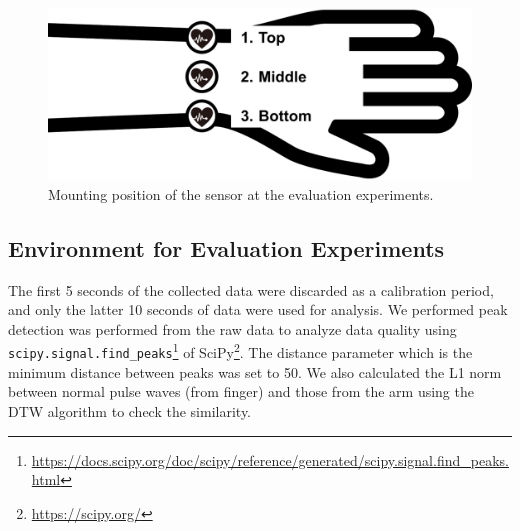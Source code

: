 \documentclass[sigconf]{acmart}
\begin{document}
\begin{figure}[!t]
  \centering
  \includegraphics[width=1\linewidth]{figures/position.eps}
  \caption{Mounting position of the sensor at the evaluation experiments.}
  \label{fig:position}
\end{figure}


\subsection{Environment for Evaluation Experiments}
The first 5 seconds of the collected data were discarded as a calibration period, and only the latter 10 seconds of data were used for analysis.
We performed peak detection was performed from the raw data to analyze data quality using \texttt{scipy.signal.find\_peaks}\footnote{\url{https://docs.scipy.org/doc/scipy/reference/generated/scipy.signal.find_peaks.html}} of SciPy\footnote{\url{https://scipy.org/}}.%
The distance parameter which is the minimum distance between peaks was set to 50. We also calculated the L1 norm between normal pulse waves (from finger) and those from the arm using the DTW algorithm to check the similarity.
\end{document}
